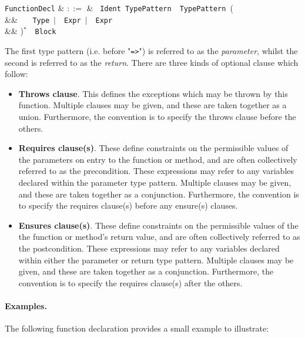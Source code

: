 \begin{syntax}
  \verb+FunctionDecl+ & $::=$ & \ \verb+Ident+\
  \verb+TypePattern+\ \token{=>}\ \verb+TypePattern+\ \big(\\
  && \ \ \ \verb+Type+\ $|$\ \
  \verb+Expr+\ $|$\ \ \verb+Expr+\\
  && \big)$^*$\ \token{:}\ \verb+Block+\\
\end{syntax}

The first type pattern (i.e. before "\lstinline{=>}") is referred to
as the {\em parameter}, whilst the second is referred to as the {\em
  return}.  There are three kinds of optional clause which follow:

\begin{itemize}
\item {\bf Throws clause}. This defines the exceptions which may be
  thrown by this function. Multiple clauses may be given, and these
  are taken together as a union. Furthermore, the convention is to
  specify the throws clause before the others.

\item {\bf Requires clause(s)}. These define constraints on the
  permissible values of the parameters on entry to the function or
  method, and are often collectively referred to as the
  \gls{precondition}. These expressions may refer to any variables
  declared within the parameter type pattern. Multiple clauses may be
  given, and these are taken together as a conjunction. Furthermore,
  the convention is to specify the requires clause(s) before any
  ensure(s) clauses.

\item {\bf Ensures clause(s)}. These define constraints on the
  permissible values of the the function or method's return value, and
  are often collectively referred to as the \gls{postcondition}. These
  expressions may refer to any variables declared within either the
  parameter or return type pattern.  Multiple clauses may be given,
  and these are taken together as a conjunction. Furthermore, the
  convention is to specify the requires clause(s) after the others.
\end{itemize}

\paragraph{Examples.}
The following function declaration provides a small example to
illustrate:

